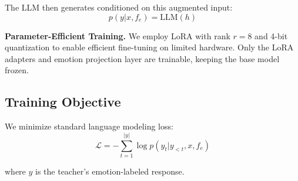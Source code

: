 The LLM then generates conditioned on this augmented input:
$$p(y | x, f_e) = \text{LLM}(h)$$

\textbf{Parameter-Efficient Training.} We employ LoRA \cite{hu2021lora} with rank $r=8$ and 4-bit quantization to enable efficient fine-tuning on limited hardware. Only the LoRA adapters and emotion projection layer are trainable, keeping the base model frozen.

\subsection{Training Objective}

We minimize standard language modeling loss:
$$\mathcal{L} = -\sum_{t=1}^{|y|} \log p(y_t | y_{<t}, x, f_e)$$

where $y$ is the teacher's emotion-labeled response.
